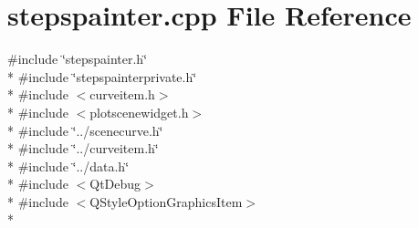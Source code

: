 \section{stepspainter.\+cpp File Reference}
\label{bk3_2curve_2painters_2stepspainter_8cpp}
{\ttfamily \#include \char`\"{}stepspainter.\+h\char`\"{}}\\*
{\ttfamily \#include \char`\"{}stepspainterprivate.\+h\char`\"{}}\\*
{\ttfamily \#include $<$curveitem.\+h$>$}\\*
{\ttfamily \#include $<$plotscenewidget.\+h$>$}\\*
{\ttfamily \#include \char`\"{}../scenecurve.\+h\char`\"{}}\\*
{\ttfamily \#include \char`\"{}../curveitem.\+h\char`\"{}}\\*
{\ttfamily \#include \char`\"{}../data.\+h\char`\"{}}\\*
{\ttfamily \#include $<$Qt\+Debug$>$}\\*
{\ttfamily \#include $<$Q\+Style\+Option\+Graphics\+Item$>$}\\*
